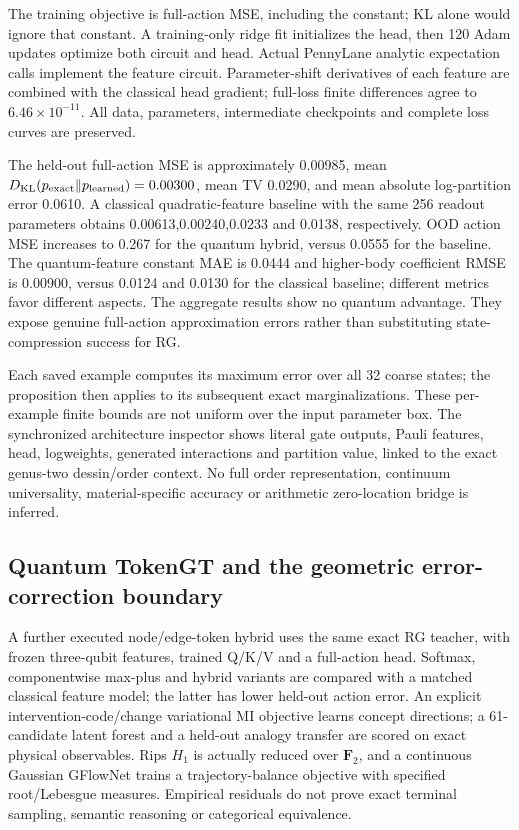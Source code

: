 \documentclass[11pt]{article}
\theoremstyle{definition}\newtheorem{definition}[theorem]{Definition}
\theoremstyle{remark}\newtheorem{remark}[theorem]{Remark}
\begin{document}
The training objective is full-action MSE, including the constant; KL alone
would ignore that constant. A training-only ridge fit initializes the head,
then 120 Adam updates optimize both circuit and head. Actual PennyLane
analytic expectation calls implement the feature circuit. Parameter-shift
derivatives of each feature are combined with the classical head gradient;
full-loss finite differences agree to $6.46\times 10^{-11}$. All data,
parameters, intermediate checkpoints and complete loss curves are preserved.

The held-out full-action MSE is approximately 0.00985, mean
$ D_{\mathrm{KL}}(p_{\rm exact}\Vert p_{\rm learned})=0.00300$, mean TV 0.0290,
and mean absolute log-partition error 0.0610. A classical quadratic-feature
baseline with the same 256 readout parameters obtains 0.00613,0.00240,0.0233
and 0.0138, respectively. OOD action MSE increases to 0.267 for the quantum
hybrid, versus 0.0555 for the baseline. The quantum-feature constant MAE is 0.0444 and higher-body coefficient
RMSE is 0.00900, versus 0.0124 and 0.0130 for the classical baseline; different
metrics favor different aspects. The aggregate results show no quantum
advantage. They expose genuine full-action approximation errors rather
than substituting state-compression success for RG.

Each saved example computes its maximum error over all 32 coarse states;
the proposition then applies to its subsequent exact marginalizations.
These per-example finite bounds are not uniform over the input parameter
box. The synchronized architecture inspector shows literal gate outputs,
Pauli features, head, logweights, generated interactions and partition
value, linked to the exact genus-two dessin/order context. No full order
representation, continuum universality, material-specific accuracy or
arithmetic zero-location bridge is inferred.

\subsection{Quantum TokenGT and the geometric error-correction boundary}
A further executed node/edge-token hybrid uses the same exact RG teacher,
with frozen three-qubit features, trained Q/K/V and a full-action head.
Softmax, componentwise max-plus and hybrid variants are compared with a
matched classical feature model; the latter has lower held-out action error.
An explicit intervention-code/change variational MI objective learns concept
directions; a 61-candidate latent forest and a held-out analogy transfer are
scored on exact physical observables. Rips $ H_1$ is actually reduced over
$\mathbf F_2$, and a continuous Gaussian GFlowNet trains a trajectory-balance
objective with specified root/Lebesgue measures. Empirical residuals do not
prove exact terminal sampling, semantic reasoning or categorical equivalence.
\end{document}
